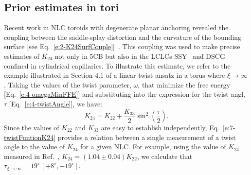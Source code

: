 \subsection{Prior estimates in tori}
Recent work in NLC toroids with degenerate planar anchoring revealed the coupling between the saddle-splay distortion and the curvature of the bounding surface [see Eq.~\ref{e:2-K24SurfCouple}]~\cite{RN24,RN59}.
This coupling was used to make precise estimates of $K_{24}$ not only in 5CB but also in the LCLCs SSY~\cite{RN191,RN293} and DSCG~\cite{RN293} confined in cylindrical capillaries.
To illustrate this estimate, we refer to the example illustrated in Section 4.1 of a linear twist ansatz in a torus where $\xi \rightarrow \infty$.
Taking the values of the twist parameter, $\omega$, that minimize the free energy [Eq.~\ref{e:4-omegaMinFFE}] and substituting into the expression for the twist angl, $\tau$ [Eq.~\ref{e:4-twistAngle}], we have:
\begin{equation}
  K_{24} = K_{22} + \frac{K_{33}}{2}\sin ^2 \left( \frac{\tau}{2} \right ).\label{e:7-twistFuntionK24}
\end{equation}
Since the values of $K_{22}$ and $K_{33}$ are easy to establish independently, Eq.~\ref{e:7-twistFuntionK24} provides a relation between a single measurement of a twist angle to the value of $K_{24}$ for a given NLC.
For example, using the value of $K_{24}$ measured in Ref.~\cite{RN24}, $K_{24} = (1.04 \pm 0.04) K_{22}$, we calculate that $\tau_{\xi \rightarrow \infty} = 19^{\circ} \, [+ 8^{\circ}, - 19^{\circ}]$.

